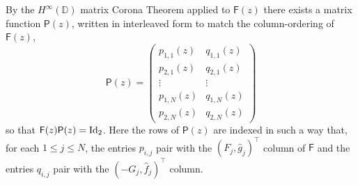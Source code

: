 \documentclass[11pt]{amsart}
\begin{document}
By the $H^\infty(\mathbb{D})$ matrix Corona Theorem applied to $\mathsf{F}(z)$ there exists a matrix function $\mathsf{P}(z)$, written in interleaved form to match the column-ordering of $\mathsf{F}(z)$,
$$
\mathsf{P}(z)=
\left(
\begin{array}{cc}
 p_{1,1}(z) & q_{1,1}(z) \\
 p_{2,1}(z) & q_{2,1}(z) \\
 \vdots & \vdots \\
 p_{1,N}(z) & q_{1,N}(z) \\
 p_{2,N}(z) & q_{2,N}(z)
\end{array}
\right)
$$
so that $\mathsf{F}(z)\mathsf{P}(z)=\textnormal{Id}_2$.  Here the rows of $\mathsf{P}(z)$ are indexed in such a way that, for each $1\le j\le N$, the entries $p_{i,j}$ pair with the $(F_j,\hat{g}_j)^\top$ column of $\mathsf{F}$ and the entries $q_{i,j}$ pair with the $(-G_j,\hat{f}_j)^\top$ column.
\end{document}
